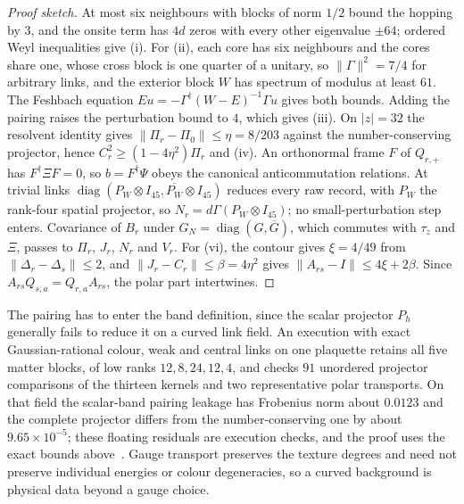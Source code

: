\documentclass[11pt]{article}
\begin{document}
\begin{proof}[Proof sketch]
At most six neighbours with blocks of norm \(1/2\) bound the hopping by \(3\), and the
onsite term has \(4d\) zeros with every other eigenvalue \(\pm64\); ordered Weyl
inequalities give (i). For (ii), each core has six neighbours and the cores share one,
whose cross block is one quarter of a unitary, so \(\|\Gamma\|^2=7/4\) for arbitrary links,
and the exterior block \(W\) has spectrum of modulus at least \(61\). The Feshbach equation
\(Eu=-\Gamma^\dagger(W-E)^{-1}\Gamma u\) gives both bounds. Adding the pairing raises the perturbation
bound to \(4\), which gives (iii). On \(|z|=32\) the resolvent identity gives
\(\|\Pi_r-\Pi_0\|\le\eta=8/203\) against the number-conserving projector, hence
\(C_r^2\ge(1-4\eta^2)\Pi_r\) and (iv). An orthonormal frame \(F\) of \(Q_{r,+}\) has
\(F^\dagger\Xi F=0\), so \(b=F^\dagger\Psi\) obeys the canonical anticommutation relations. At
trivial links \(\operatorname{diag}(P_W\otimes I_{45},\overline{P_W}\otimes I_{45})\) reduces every
raw record, with \(P_W\) the rank-four spatial projector, so \(N_r=d\Gamma(P_W\otimes I_{45})\);
no small-perturbation step enters. Covariance of \(B_r\) under
\(G_N=\operatorname{diag}(G,\overline G)\), which commutes with \(\tau_z\) and \(\Xi\), passes to
\(\Pi_r\), \(J_r\), \(N_r\) and \(V_r\). For (vi), the contour gives \(\xi=4/49\) from
\(\|\Delta_r-\Delta_s\|\le2\), and \(\|J_r-C_r\|\le\beta=4\eta^2\) gives
\(\|A_{rs}-I\|\le4\xi+2\beta\). Since \(A_{rs}Q_{s,a}=Q_{r,a}A_{rs}\), the polar part intertwines.
\end{proof}

The pairing has to enter the band definition, since the scalar projector \(P_h\) generally
fails to reduce it on a curved link field. An execution with exact Gaussian-rational
colour, weak and central links on one plaquette retains all five matter blocks, of low
ranks \(12,8,24,12,4\), and checks \(91\) unordered projector comparisons of the thirteen
kernels and two representative polar transports. On that field the scalar-band pairing
leakage has Frobenius norm about \(0.0123\) and the complete projector differs from the
number-conserving one by about \(9.65\times10^{-5}\); these floating residuals are
execution checks, and the proof uses the exact bounds above~\cite{ophrepo}. Gauge transport
preserves the texture degrees and need not preserve individual energies or colour
degeneracies, so a curved background is physical data beyond a gauge choice.
\end{document}
